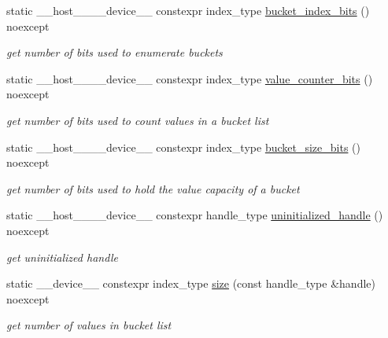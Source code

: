 \begin{DoxyCompactItemize}
\item 
static \+\_\+\+\_\+host\+\_\+\+\_\+\+\_\+\+\_\+device\+\_\+\+\_\+ constexpr index\+\_\+type \hyperlink{classwarpcore_1_1storage_1_1multi__value_1_1BucketListStore_a0c06c0510ccdf194bda9ddffcf7fcd76}{bucket\+\_\+index\+\_\+bits} () noexcept
\begin{DoxyCompactList}\small\item\em get number of bits used to enumerate buckets \end{DoxyCompactList}\item 
static \+\_\+\+\_\+host\+\_\+\+\_\+\+\_\+\+\_\+device\+\_\+\+\_\+ constexpr index\+\_\+type \hyperlink{classwarpcore_1_1storage_1_1multi__value_1_1BucketListStore_ad3b1f4fe9309268bf115ea5f86a0e8d8}{value\+\_\+counter\+\_\+bits} () noexcept
\begin{DoxyCompactList}\small\item\em get number of bits used to count values in a bucket list \end{DoxyCompactList}\item 
static \+\_\+\+\_\+host\+\_\+\+\_\+\+\_\+\+\_\+device\+\_\+\+\_\+ constexpr index\+\_\+type \hyperlink{classwarpcore_1_1storage_1_1multi__value_1_1BucketListStore_a959c5f2ba54bb17301bdba11c21b5c44}{bucket\+\_\+size\+\_\+bits} () noexcept
\begin{DoxyCompactList}\small\item\em get number of bits used to hold the value capacity of a bucket \end{DoxyCompactList}\item 
static \+\_\+\+\_\+host\+\_\+\+\_\+\+\_\+\+\_\+device\+\_\+\+\_\+ constexpr handle\+\_\+type \hyperlink{classwarpcore_1_1storage_1_1multi__value_1_1BucketListStore_a5c4db432625508fb99f55cd68e69f066}{uninitialized\+\_\+handle} () noexcept
\begin{DoxyCompactList}\small\item\em get uninitialized handle \end{DoxyCompactList}\item 
static \+\_\+\+\_\+device\+\_\+\+\_\+ constexpr index\+\_\+type \hyperlink{classwarpcore_1_1storage_1_1multi__value_1_1BucketListStore_a304222076c88aa24e0c7dcd4b32265fa}{size} (const handle\+\_\+type \&handle) noexcept
\begin{DoxyCompactList}\small\item\em get number of values in bucket list \end{DoxyCompactList}\end{DoxyCompactItemize}


